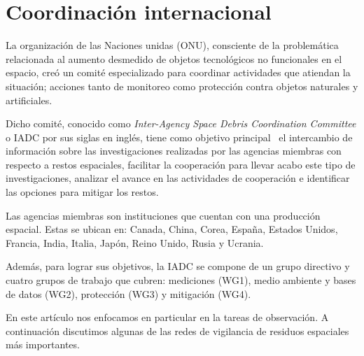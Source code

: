 \section*{Coordinación internacional} \label{sec:coordinacion}

La organización de las Naciones unidas (ONU), consciente de la problemática relacionada al aumento desmedido de objetos tecnológicos no funcionales en el espacio, creó un comité especializado para coordinar actividades que atiendan la situación;
acciones tanto de monitoreo como protección contra objetos naturales y artificiales.

Dicho comité, conocido como  \textit{Inter-Agency Space Debris Coordination Committee} o IADC por sus siglas en inglés,
tiene como objetivo principal~\cite{iadc_doc} el intercambio de información sobre las investigaciones realizadas por las agencias miembras con respecto a restos espaciales,
facilitar la cooperación para llevar acabo este tipo de investigaciones, 
analizar el avance en las actividades de cooperación 
e identificar las opciones para mitigar los restos.

Las agencias miembras son instituciones que cuentan con una producción espacial. 
Estas se ubican en:  
Canada, China, Corea, España, Estados Unidos, Francia, India, Italia, Japón, Reino Unido, Rusia y Ucrania.

Además, para lograr sus objetivos,
la IADC se compone de un grupo directivo y cuatro grupos de trabajo que cubren:
mediciones (WG1),
medio ambiente y bases de datos (WG2),
protección (WG3) 
y
mitigación (WG4).

En este artículo nos enfocamos en particular en la tareas de observación. 
A continuación discutimos algunas de las redes de vigilancia de residuos espaciales más importantes.
